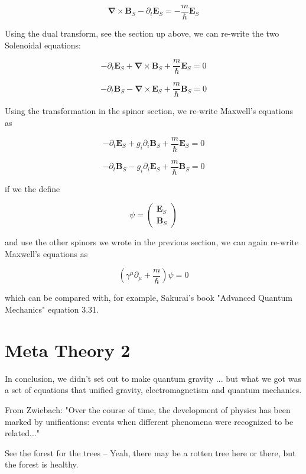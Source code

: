 \documentclass {article}
\renewcommand\vec{\mathbf}
\let\OldS\nabla
\renewcommand{\nabla}{\boldsymbol{\OldS}}
\begin{document}
$$\nabla \times \vec B_S  - \partial_t \vec E_S  = - \frac m {\hbar} \vec E_S $$

Using the dual transform, see the section up above, we can re-write the two Solenoidal equations:

$$-\partial_t \vec E_S + \nabla \times \vec B_S   +\frac m {\hbar} \vec E_S = 0 $$ 

$$ -\partial_t \vec B_S - \nabla \times \vec E_S   +\frac m {\hbar} \vec B_S = 0$$ 


Using the transformation in the spinor section, we  re-write Maxwell's equations as 

$$-\partial_t \vec E_S + g_i \partial_i \vec B_S   +\frac m {\hbar} \vec E_S = 0 $$ 

$$ -\partial_t \vec B_S - g_i \partial_i \vec E_S   +\frac m {\hbar} \vec B_S = 0 $$ 


if we the define 

$$\psi = \left(\begin{matrix}  \vec E_S \\ \vec B_S \end{matrix}\right) $$

and use the other spinors we wrote in the previous section, we can again re-write Maxwell's equations as

$$\left(\gamma^{\mu} \partial_{\mu} + \frac m {\hbar} \right) \psi = 0 $$

which can be compared with, for example, Sakurai's book "Advanced Quantum Mechanics" equation 3.31.

\newpage

\section{Meta Theory 2}
In conclusion, we didn't set out to make quantum gravity ... but what we got was a set of equations that unified gravity, electromagnetism and quantum mechanics.

From Zwiebach: "Over the course of time, the development of physics has been marked by unifications: events when different phenomena were recognized to be related..."


See the forest for the trees -- Yeah, there may be a rotten tree here or there, but the forest is healthy.
\newpage
\end{document}
